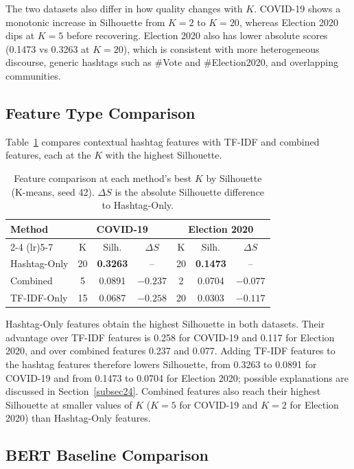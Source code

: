 \documentclass[pdflatex,sn-mathphys-num]{sn-jnl}%
\begin{document}
The two datasets also differ in how quality changes with $K$. COVID-19 shows a monotonic increase in Silhouette from $K=2$ to $K=20$, whereas Election 2020 dips at $K=5$ before recovering. Election 2020 also has lower absolute scores (0.1473 vs 0.3263 at $K=20$), which is consistent with more heterogeneous discourse, generic hashtags such as \#Vote and \#Election2020, and overlapping communities.

\subsection{Feature Type Comparison}\label{subsec20}

Table~\ref{tab:feature_comparison} compares contextual hashtag features with TF-IDF and combined features, each at the $K$ with the highest Silhouette.

\begin{table}[t]
\centering
\caption{Feature comparison at each method's best $K$ by Silhouette (K-means, seed 42). $\Delta S$ is the absolute Silhouette difference to Hashtag-Only.}
\label{tab:feature_comparison}
\begin{tabular}{lcccccc}
\toprule
\multirow{2}{*}{Method} & \multicolumn{3}{c}{COVID-19} & \multicolumn{3}{c}{Election 2020} \\
\cmidrule(lr){2-4} \cmidrule(lr){5-7}
 & K & Silh. & $\Delta S$ & K & Silh. & $\Delta S$ \\
\midrule
Hashtag-Only & 20 & \textbf{0.3263} & -- & 20 & \textbf{0.1473} & -- \\
Combined     & 5  & 0.0891 & $-0.237$ & 2  & 0.0704 & $-0.077$ \\
TF-IDF-Only  & 15 & 0.0687 & $-0.258$ & 20 & 0.0303 & $-0.117$ \\
\bottomrule
\end{tabular}
\end{table}

Hashtag-Only features obtain the highest Silhouette in both datasets. Their advantage over TF-IDF features is 0.258 for COVID-19 and 0.117 for Election 2020, and over combined features 0.237 and 0.077. Adding TF-IDF features to the hashtag features therefore lowers Silhouette, from 0.3263 to 0.0891 for COVID-19 and from 0.1473 to 0.0704 for Election 2020; possible explanations are discussed in Section~\ref{subsec24}. Combined features also reach their highest Silhouette at smaller values of $K$ ($K=5$ for COVID-19 and $K=2$ for Election 2020) than Hashtag-Only features.

\subsection{BERT Baseline Comparison}\label{subsec21}
\end{document}

